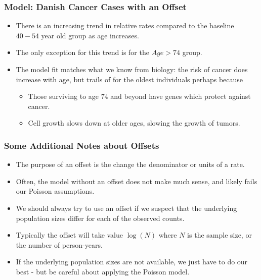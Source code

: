 \documentclass[10pt,xcolor={svgnames},t]{beamer}
\begin{document}
\begin{frame}
	\frametitle{Model: Danish Cancer Cases with an Offset}
	
	\begin{itemize}
		\item There is an increasing trend in relative rates compared to the baseline $40-54$ year old group as age increases.
		\bigskip
		\item The only exception for this trend is for the $Age>74$ group.
		\bigskip
		\item The model fit matches what we know from biology: the risk of cancer does increase with age, but trails of for the oldest individuals perhaps because
		\begin{itemize}
			\item Those surviving to age $74$ and beyond have genes which protect against cancer.
			\item Cell growth slows down at older ages, slowing the growth of tumors.
		\end{itemize}
	\end{itemize}
	
	
\end{frame}
%
%
\begin{frame}
	\frametitle{Some Additional Notes about Offsets}
	
	\begin{itemize}
		\item The purpose of an offset is the change the denominator or units of a rate.
		\bigskip
		\item Often, the model without an offset does not make much sense, and likely fails our Poisson assumptions.
			\bigskip
		\item We should always try to use an offset if we suspect that the underlying population sizes differ for each of the observed counts.
			\bigskip
		\item Typically the offset will take value $\log(N)$ where $N$ is the sample size, or the number of person-years.
			\bigskip
		\item If the underlying population sizes are not available, we just have to do our best - but be careful about applying the Poisson model.
	\end{itemize}
	
	
\end{frame}
%
\end{document}
